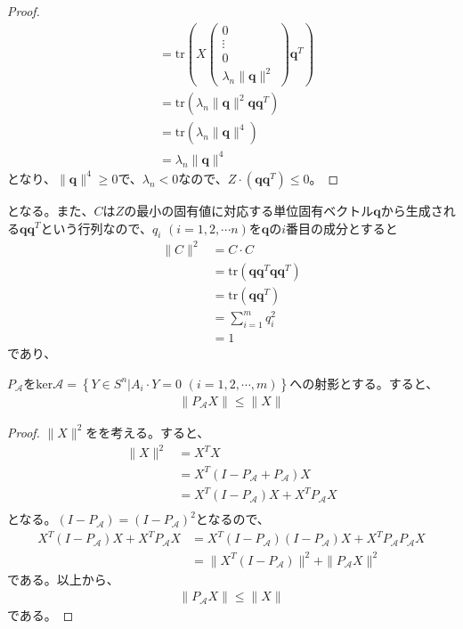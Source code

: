 \begin{proof}
\begin{align*}
                                      & = \mathrm{tr}\left(X \left(\begin{array}{c} 0 \\ \vdots \\ 0 \\ \lambda_n \|\mathbf{q}\|^2 \end{array}\right) \mathbf{q}^T\right) \\
                                      & = \mathrm{tr}\left(\lambda_n \|\mathbf{q}\|^2 \mathbf{q} \mathbf{q}^T\right) \\
                                      & = \mathrm{tr}\left(\lambda_n \|\mathbf{q}\|^4\right) \\
                                      & = \lambda_n \|\mathbf{q}\|^4
  \end{align*}
  となり、$\|\mathbf{q}\|^4 \geq 0$で、$\lambda_n < 0$なので、$Z \cdot (\mathbf{q} \mathbf{q}^T) \leq 0$。
\end{proof}
となる。また、$C$は$Z$の最小の固有値に対応する単位固有ベクトル$\mathbf{q}$から生成される$\mathbf{q} \mathbf{q}^T$という行列なので、$q_i \,\, (i = 1, 2, \cdots n)$を$\mathbf{q}$の$i$番目の成分とすると
\begin{align*}
  \|C\|^2 & = C \cdot C \\
          & = \mathrm{tr} \left(\mathbf{q} \mathbf{q}^T \mathbf{q} \mathbf{q}^T\right) \\
          & = \mathrm{tr} \left(\mathbf{q} \mathbf{q}^T\right) \\
          & = \displaystyle{\sum_{i = 1}^m q_i^2} \\
          & = 1
\end{align*}
であり、
\begin{lemma} \label{Shrink}
  $P_\mathcal{A}$を$\mathrm{ker} \mathcal{A} = \left\{Y \in S^n | A_i \cdot Y = 0 \,\, (i = 1, 2, \cdots, m)\right\}$への射影とする。すると、
  \begin{align*}
    \|P_\mathcal{A} X\| \leq \|X\|
  \end{align*}
\end{lemma}
\begin{proof}
  $\|X\|^2$をを考える。すると、
  \begin{align*}
    \|X\|^2 & = X^T X \\
            & = X^T (I - P_\mathcal{A} + P_\mathcal{A}) X \\
            & = X^T (I - P_\mathcal{A}) X + X^T P_\mathcal{A} X \\
  \end{align*}
  となる。$(I - P_\mathcal{A}) = (I - P_\mathcal{A})^2$となるので、
  \begin{align*}
    X^T (I - P_\mathcal{A}) X + X^T P_\mathcal{A} X & = X^T (I - P_\mathcal{A}) (I - P_\mathcal{A}) X + X^T P_\mathcal{A} P_\mathcal{A} X\\
                                                    & = \|X^T (I - P_\mathcal{A})\|^2 + \|P_\mathcal{A} X\|^2
  \end{align*}
  である。以上から、
  \begin{align*}
    \|P_\mathcal{A} X\| \leq \|X\|
  \end{align*}
  である。
\end{proof}
